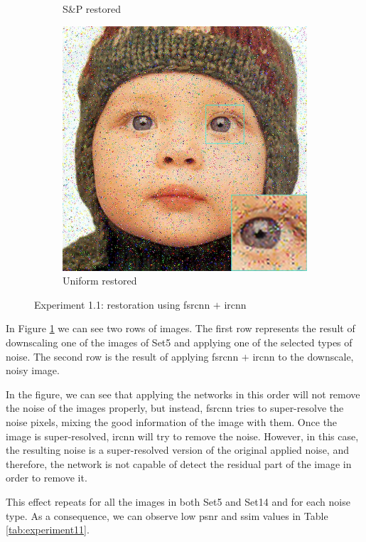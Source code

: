 \begin{figure}
\begin{subfigure}{0.24\textwidth}
		\caption{S\&P restored}
	\end{subfigure}
	\begin{subfigure}{0.24\textwidth}
		\includegraphics[width=\textwidth]{images/exp1.1/uniform.png}
		\caption{Uniform restored}
	\end{subfigure}
	\caption{Experiment 1.1: restoration using \gls{fsrcnn} $+$ \gls{ircnn}}
	\label{fig:exp1.1}
\end{figure}

In Figure \ref{fig:exp1.1} we can see two rows of images. The first row represents the result of downscaling one of the images of Set5 and applying one of the selected types of noise. The second row is the result of applying \gls{fsrcnn} $+$ \gls{ircnn} to the downscale, noisy image.

In the figure, we can see that applying the networks in this order will not remove the noise of the images properly, but instead, \gls{fsrcnn} tries to super-resolve the noise pixels, mixing the good information of the image with them. Once the image is super-resolved, \gls{ircnn} will try to remove the noise. However, in this case, the resulting noise is a super-resolved version of the original applied noise, and therefore, the network is not capable of detect the residual part of the image in order to remove it.

This effect repeats for all the images in both Set5 and Set14 and for each noise type. As a consequence, we can observe low \gls{psnr} and \gls{ssim} values in Table \ref{tab:experiment11}.


